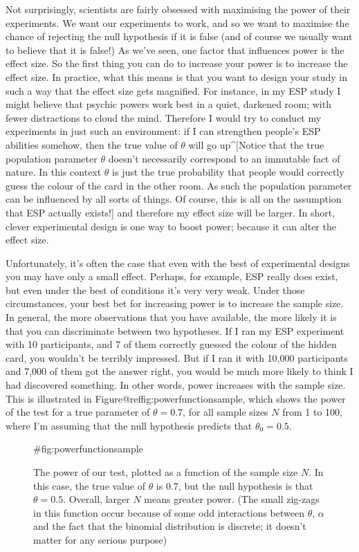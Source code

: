 Not surprisingly, scientists are fairly obsessed with maximising the power of their experiments. We want our experiments to work, and so we want to maximise the chance of rejecting the null hypothesis if it is false (and of course we usually want to believe that it is false!) As we've seen, one factor that influences power is the effect size. So the first thing you can do to increase your power is to increase the effect size. In practice, what this means is that you want to design your study in such a way that the effect size gets magnified. For instance, in my ESP study I might believe that psychic powers work best in a quiet, darkened room; with fewer distractions to cloud the mind. Therefore I would try to conduct my experiments in just such an environment: if I can strengthen people's ESP abilities somehow, then the true value of $\theta$ will go up^[Notice that the true population parameter $\theta$ doesn't necessarily correspond to an immutable fact of nature. In this context $\theta$ is just the true probability that people would correctly guess the colour of the card in the other room. As such the population parameter can be influenced by all sorts of things. Of course, this is all on the assumption that ESP actually exists!] and therefore my effect size will be larger. In short, clever experimental design is one way to boost power; because it can alter the effect size.

Unfortunately, it's often the case that even with the best of experimental designs you may have only a small effect. Perhaps, for example, ESP really does exist, but even under the best of conditions it's very very weak. Under those circumstances, your best bet for increasing power is to increase the sample size. In general, the more observations that you have available, the more likely it is that you can discriminate between two hypotheses. If I ran my ESP experiment with 10 participants, and 7 of them correctly guessed the colour of the hidden card, you wouldn't be terribly impressed. But if I ran it with 10,000 participants and 7,000 of them got the answer right, you would be much more likely to think I had discovered something. In other words, power increases with the sample size. This is illustrated in Figure@reffig:powerfunctionsample, which shows the power of the test for a true parameter of $\theta = 0.7$, for all sample sizes $N$ from 1 to 100, where I'm assuming that the null hypothesis predicts that $\theta_0 = 0.5$.  

\begin{figure}[t]
\begin{center}
\caption{The power of our test, plotted as a function of the sample size $N$. In this case, the true value of $\theta$ is 0.7, but the null hypothesis is that $\theta = 0.5$. Overall, larger $N$ means greater power. (The small zig-zags in this function occur because of some odd interactions between $\theta$, $\alpha$ and the fact that the binomial distribution is discrete; it doesn't matter for any serious purpose) }
\HR
{#fig:powerfunctionsample}
\end{center}
\end{figure}

